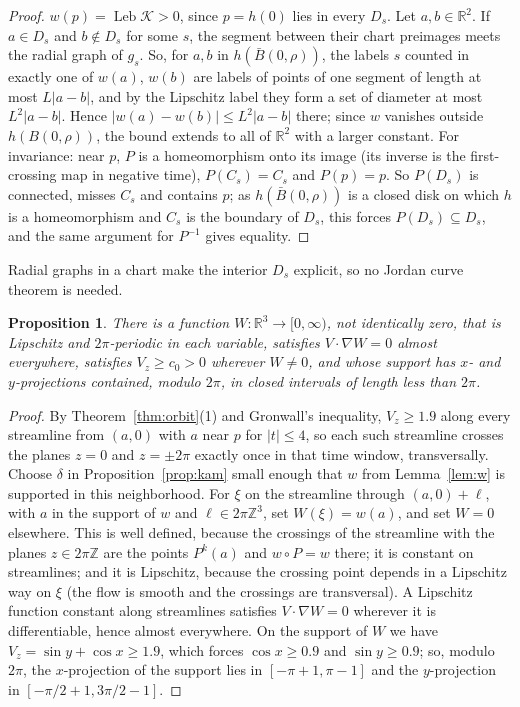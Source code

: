 \documentclass[11pt]{article}
\newtheorem{proposition}[theorem]{Proposition}
\theoremstyle{definition}
\theoremstyle{remark}
\newcommand{\R}{\mathbb{R}}
\newcommand{\Z}{\mathbb{Z}}
\newcommand{\Leb}{\operatorname{Leb}}
\begin{document}
\begin{proof}
$w(p)=\Leb\mathcal K>0$, since $p=h(0)$ lies in every $D_s$. Let $a,b\in\R^2$.
If $a\in D_s$ and $b\notin D_s$ for some $s$, the segment between their
chart preimages meets the radial graph of $g_s$. So, for $a,b$ in
$h(\bar B(0,\rho))$, the labels $s$ counted in exactly one of $w(a)$, $w(b)$
are labels of points of one segment of length at most $L|a-b|$, and by the
Lipschitz label they form a set of diameter at most $L^2|a-b|$. Hence
$|w(a)-w(b)|\le L^2|a-b|$ there; since $w$ vanishes outside
$h(B(0,\rho))$, the bound extends to all of $\R^2$ with a larger constant. For invariance: near $p$, $P$ is a
homeomorphism onto its image (its inverse is the first-crossing map in
negative time), $P(C_s)=C_s$ and $P(p)=p$. So $P(D_s)$ is connected, misses
$C_s$ and contains $p$; as $h(\bar B(0,\rho))$ is a closed disk on which $h$
is a homeomorphism and $C_s$ is the boundary of $D_s$, this forces
$P(D_s)\subseteq D_s$, and the same argument for $P^{-1}$ gives equality.
\end{proof}

Radial graphs in a chart make the interior $D_s$ explicit, so no Jordan curve
theorem is needed.

\begin{proposition}\label{prop:tube}
There is a function $W\colon\R^3\to[0,\infty)$, not identically zero, that is
Lipschitz and $2\pi$-periodic in each variable, satisfies $V\cdot\nabla W=0$
almost everywhere, satisfies $V_z\ge c_0>0$ wherever $W\ne0$, and whose
support has $x$- and $y$-projections contained, modulo $2\pi$, in closed
intervals of length less than $2\pi$.
\end{proposition}

\begin{proof}
By Theorem~\ref{thm:orbit}(1) and Gronwall's inequality, $V_z\ge1.9$ along
every streamline from $(a,0)$ with $a$ near $p$ for $|t|\le4$, so each such
streamline crosses the planes $z=0$ and $z=\pm2\pi$ exactly once in that time
window, transversally. Choose $\delta$ in Proposition~\ref{prop:kam} small
enough that $w$ from Lemma~\ref{lem:w} is supported in this neighborhood.
For $\xi$ on the streamline through $(a,0)+\ell$, with $a$ in the support of
$w$ and $\ell\in2\pi\Z^3$, set $W(\xi)=w(a)$, and set $W=0$ elsewhere. This is
well defined, because the crossings of the streamline with the planes
$z\in2\pi\Z$ are the points $P^k(a)$ and $w\circ P=w$ there; it is constant
on streamlines; and it is Lipschitz, because the crossing point depends in a
Lipschitz way on $\xi$ (the flow is smooth and the crossings are
transversal). A Lipschitz function constant along streamlines satisfies
$V\cdot\nabla W=0$ wherever it is differentiable, hence almost everywhere.
On the support of $W$ we have $V_z=\sin y+\cos x\ge1.9$, which forces
$\cos x\ge0.9$ and $\sin y\ge0.9$; so, modulo $2\pi$, the $x$-projection of
the support lies in $[-\pi+1,\pi-1]$ and the $y$-projection in
$[-\pi/2+1,3\pi/2-1]$.
\end{proof}
\end{document}
